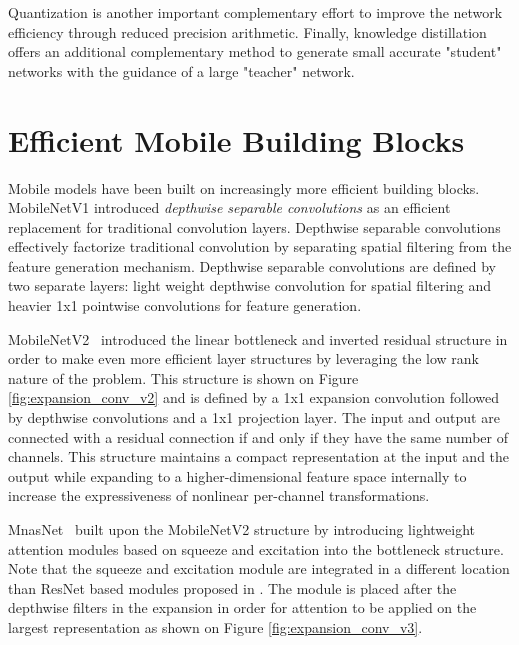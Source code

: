 \documentclass[10pt,twocolumn,letterpaper]{article}
\begin{document}
Quantization \cite{fakequant,quantwhite,QCNN,SouHub14,Increment_quant,DoReFa-Net,Xnor-Net} is another important complementary effort to improve the network efficiency through reduced precision arithmetic. Finally, knowledge distillation \cite{ModelCompression,Distill} offers an additional complementary method to generate small accurate "student" networks with the guidance of a large "teacher" network.

\section{Efficient Mobile Building Blocks}
\label{section:building}
%
Mobile models have been built on increasingly more efficient building blocks. MobileNetV1 \cite{MobilenetV1} introduced {\it depthwise separable convolutions} as an efficient replacement for traditional convolution layers. Depthwise separable convolutions effectively factorize traditional convolution by separating spatial filtering from the feature generation mechanism. Depthwise separable convolutions are defined by two separate layers: light weight depthwise convolution for spatial filtering and heavier 1x1 pointwise convolutions for feature generation.

MobileNetV2~\cite{mobilenetv2} introduced the linear bottleneck and inverted residual structure in order to make even more efficient layer structures by leveraging the low rank nature of the problem. This structure is shown on Figure \ref{fig:expansion_conv_v2} and is defined by a 1x1 expansion convolution followed by depthwise convolutions and a 1x1 projection layer. The input and output are connected with a residual connection if and only if they have the same number of channels. This structure maintains a compact representation at the input and the output while expanding to a higher-dimensional feature space internally to increase the expressiveness of nonlinear per-channel transformations.

MnasNet~\cite{mnasnet} built upon the MobileNetV2 structure by introducing lightweight attention modules based on squeeze and excitation into the bottleneck structure. Note that the squeeze and excitation module are integrated in a different location than ResNet based modules proposed in \cite{squeezeandexcite}. The module is placed after the depthwise filters in the expansion in order for attention to be applied on the largest representation as shown on Figure \ref{fig:expansion_conv_v3}.
\end{document}
